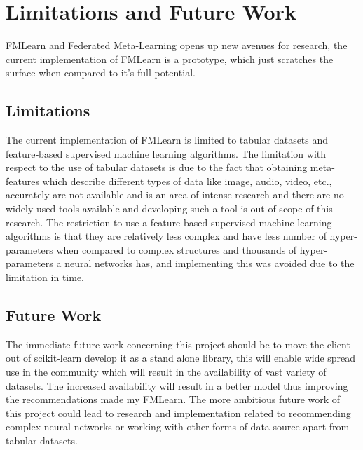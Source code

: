 \chapter{Limitations and Future Work}

FMLearn and Federated Meta-Learning opens up new avenues for research, the current implementation of FMLearn is a prototype, which just scratches the surface when compared to it's full potential.

\section*{Limitations}

The current implementation of FMLearn is limited to tabular datasets and feature‐based supervised machine learning algorithms. The limitation with respect to the use of tabular datasets is due to the fact that obtaining meta-features which describe different types of data like image, audio, video, etc., accurately are not available and is an area of intense research \citep{image-meta-data} \citep{image-meta-data-2} and there are no widely used tools available and developing such a tool is out of scope of this research. The restriction to use a feature-based supervised machine learning algorithms is that they are relatively less complex and have less number of hyper-parameters when compared to complex structures and thousands of hyper-parameters a neural networks has, and implementing this was avoided due to the limitation in time.

\section*{Future Work}

The immediate future work concerning this project should be to move the client out of scikit-learn develop it as a stand alone library, this will enable wide spread use in the community which will result in the availability of vast variety of datasets. The increased availability will result in a better model thus improving the recommendations made my FMLearn. The more ambitious future work of this project could lead to research and implementation related to recommending complex neural networks or working with other forms of data source apart from tabular datasets.